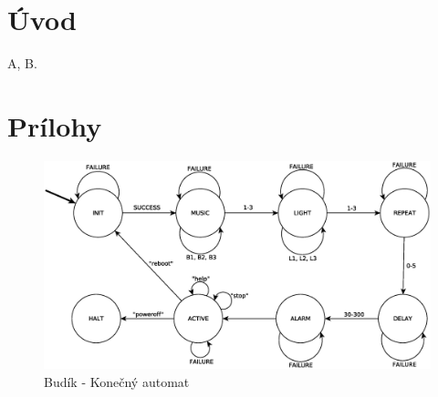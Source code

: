 \documentclass[11pt,a4paper]{article}
\begin{document}

\setlength{\parskip}{0pt}
\hypersetup{hidelinks}\tableofcontents
\setlength{\parskip}{0pt}

\newpage %

\section{Úvod}

    \indent A\cite{MANUAL}, B\cite{SCHEME}.

  
\newpage
\section{Prílohy}

\begin{figure}[H]
    \centering
    \includegraphics[scale=0.5]{img/fsm.eps}
    \caption{Budík - Konečný automat}
    \label{fig:fsm}
\end{figure}

\newpage %

\makeatletter
\makeatother

\begin{flushleft}
    
\end{flushleft}
\end{document}
